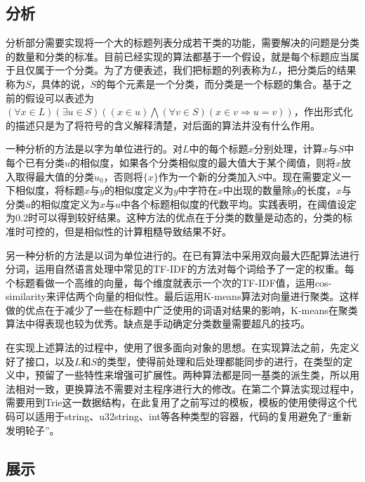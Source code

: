 \documentclass[12pt]{article}
\begin{document}
\subsection{分析}
分析部分需要实现将一个大的标题列表分成若干类的功能，需要解决的问题是分类的数量和分类的标准。目前已经实现的算法都基于一个假设，就是每个标题应当属于且仅属于一个分类。为了方便表述，我们把标题的列表称为$L$，把分类后的结果称为$S$，具体的说，$S$的每个元素是一个分类，而分类是一个标题的集合。基于之前的假设可以表述为$(\forall x \in L)(\exists u \in S)((x \in u )\bigwedge(\forall v \in S) (x \in v \Rightarrow u = v))$，作出形式化的描述只是为了将符号的含义解释清楚，对后面的算法并没有什么作用。

一种分析的方法是以字为单位进行的。对$L$中的每个标题$x$分别处理，计算$x$与$S$中每个已有分类$u$的相似度，如果各个分类相似度的最大值大于某个阈值，则将$x$放入取得最大值的分类$u_0$，否则将$\lbrace x\rbrace$作为一个新的分类加入$S$中。现在需要定义一下相似度，将标题$x$与$y$的相似度定义为$y$中字符在$x$中出现的数量除$y$的长度，$x$与分类$u$的相似度定义为$x$与$u$中各个标题相似度的代数平均。实践表明，在阈值设定为0.2时可以得到较好结果。这种方法的优点在于分类的数量是动态的，分类的标准时可控的，但是相似性的计算粗糙导致结果不好。

另一种分析的方法是以词为单位进行的。在已有算法中采用双向最大匹配算法进行分词，运用自然语言处理中常见的TF-IDF的方法对每个词给予了一定的权重。每个标题看做一个高维的向量，每个维度就表示一个次的TF-IDF值，运用cos-similarity来评估两个向量的相似性。最后运用K-means算法对向量进行聚类。这样做的优点在于减少了一些在标题中广泛使用的词语对结果的影响，K-means在聚类算法中得表现也较为优秀。缺点是手动确定分类数量需要超凡的技巧。

在实现上述算法的过程中，使用了很多面向对象的思想。在实现算法之前，先定义好了接口，以及$L$和$S$的类型，使得前处理和后处理都能同步的进行，在类型的定义中，预留了一些特性来增强可扩展性。两种算法都是同一基类的派生类，所以用法相对一致，更换算法不需要对主程序进行大的修改。在第二个算法实现过程中，需要用到Trie这一数据结构，在此复用了之前写过的模板，模板的使用使得这个代码可以适用于string、u32string、int等各种类型的容器，代码的复用避免了“重新发明轮子”。
\subsection{展示}
\end{document}
